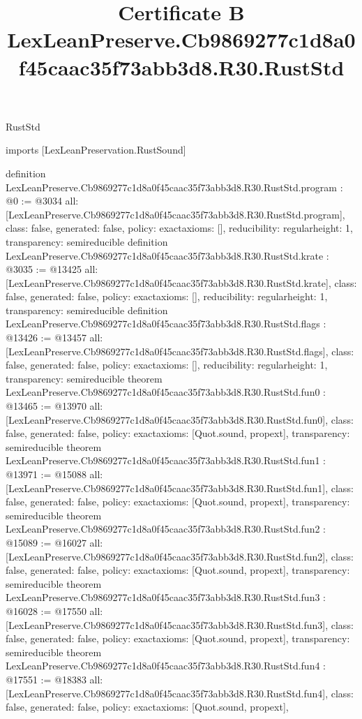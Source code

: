 \begin{lexlean}{RustStd}
\title{Certificate B LexLeanPreserve.Cb9869277c1d8a0f45caac35f73abb3d8.R30.RustStd}
\begin{coremodule}
imports [LexLeanPreservation.RustSound]

definition LexLeanPreserve.Cb9869277c1d8a0f45caac35f73abb3d8.R30.RustStd.program : @0 := @3034 {
  all: [LexLeanPreserve.Cb9869277c1d8a0f45caac35f73abb3d8.R30.RustStd.program],
  class: false,
  generated: false,
  policy: exact{axioms: []},
  reducibility: regular{height: 1},
  transparency: semireducible
}
definition LexLeanPreserve.Cb9869277c1d8a0f45caac35f73abb3d8.R30.RustStd.krate : @3035 := @13425 {
  all: [LexLeanPreserve.Cb9869277c1d8a0f45caac35f73abb3d8.R30.RustStd.krate],
  class: false,
  generated: false,
  policy: exact{axioms: []},
  reducibility: regular{height: 1},
  transparency: semireducible
}
definition LexLeanPreserve.Cb9869277c1d8a0f45caac35f73abb3d8.R30.RustStd.flags : @13426 := @13457 {
  all: [LexLeanPreserve.Cb9869277c1d8a0f45caac35f73abb3d8.R30.RustStd.flags],
  class: false,
  generated: false,
  policy: exact{axioms: []},
  reducibility: regular{height: 1},
  transparency: semireducible
}
theorem LexLeanPreserve.Cb9869277c1d8a0f45caac35f73abb3d8.R30.RustStd.fun0 : @13465 := @13970 {
  all: [LexLeanPreserve.Cb9869277c1d8a0f45caac35f73abb3d8.R30.RustStd.fun0],
  class: false,
  generated: false,
  policy: exact{axioms: [Quot.sound, propext]},
  transparency: semireducible
}
theorem LexLeanPreserve.Cb9869277c1d8a0f45caac35f73abb3d8.R30.RustStd.fun1 : @13971 := @15088 {
  all: [LexLeanPreserve.Cb9869277c1d8a0f45caac35f73abb3d8.R30.RustStd.fun1],
  class: false,
  generated: false,
  policy: exact{axioms: [Quot.sound, propext]},
  transparency: semireducible
}
theorem LexLeanPreserve.Cb9869277c1d8a0f45caac35f73abb3d8.R30.RustStd.fun2 : @15089 := @16027 {
  all: [LexLeanPreserve.Cb9869277c1d8a0f45caac35f73abb3d8.R30.RustStd.fun2],
  class: false,
  generated: false,
  policy: exact{axioms: [Quot.sound, propext]},
  transparency: semireducible
}
theorem LexLeanPreserve.Cb9869277c1d8a0f45caac35f73abb3d8.R30.RustStd.fun3 : @16028 := @17550 {
  all: [LexLeanPreserve.Cb9869277c1d8a0f45caac35f73abb3d8.R30.RustStd.fun3],
  class: false,
  generated: false,
  policy: exact{axioms: [Quot.sound, propext]},
  transparency: semireducible
}
theorem LexLeanPreserve.Cb9869277c1d8a0f45caac35f73abb3d8.R30.RustStd.fun4 : @17551 := @18383 {
  all: [LexLeanPreserve.Cb9869277c1d8a0f45caac35f73abb3d8.R30.RustStd.fun4],
  class: false,
  generated: false,
  policy: exact{axioms: [Quot.sound, propext]},
}
\end{coremodule}
\end{lexlean}
